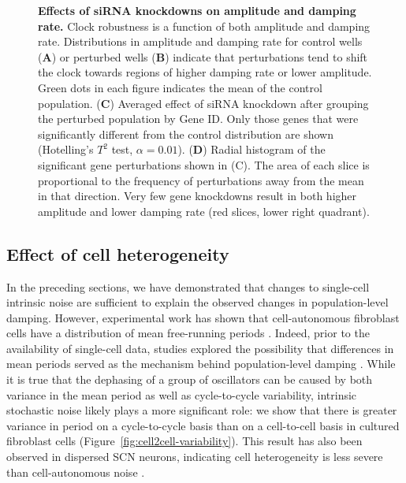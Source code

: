\documentclass[11pt, letterpaper]{article}
\begin{document}
\begin{figure}[tbp]
  \begin{center}
  \end{center}
  \caption{{\bfseries Effects of siRNA knockdowns on amplitude and damping rate.}
  Clock robustness is a function of both amplitude and damping rate.
  Distributions in amplitude and damping rate for control wells ({\bfseries A}) or perturbed wells ({\bfseries B}) indicate that perturbations tend to shift the clock towards regions of higher damping rate or lower amplitude. Green dots in each figure indicates the mean of the control population.
({\bfseries C}) Averaged effect of siRNA knockdown after grouping the perturbed population by Gene ID. Only those genes that were significantly different from the control distribution are shown (Hotelling's $T^2$ test, $\alpha = 0.01$).
({\bfseries D}) Radial histogram of the significant gene perturbations shown in (C). The area of each slice is proportional to the frequency of perturbations away from the mean in that direction. Very few gene knockdowns result in both higher amplitude and lower damping rate (red slices, lower right quadrant).
}
\label{fig:outlier_dist}
\end{figure}

\subsection*{Effect of cell heterogeneity}

In the preceding sections, we have demonstrated that changes to single-cell intrinsic noise are sufficient to explain the observed changes in population-level damping.
However, experimental work has shown that cell-autonomous fibroblast cells have a distribution of mean free-running periods \cite{Leise2012}.
Indeed, prior to the availability of single-cell data, studies explored the possibility that differences in mean periods served as the mechanism behind population-level damping \cite{Izumo2003}.
While it is true that the dephasing of a group of oscillators can be caused by both variance in the mean period as well as cycle-to-cycle variability, intrinsic stochastic noise likely plays a more significant role: we show that there is greater variance in period on a cycle-to-cycle basis than on a cell-to-cell basis in cultured fibroblast cells (Figure~\ref{fig:cell2cell-variability}).
This result has also been observed in dispersed SCN neurons, indicating cell heterogeneity is less severe than cell-autonomous noise \cite{Herzog2004}.
\end{document}
